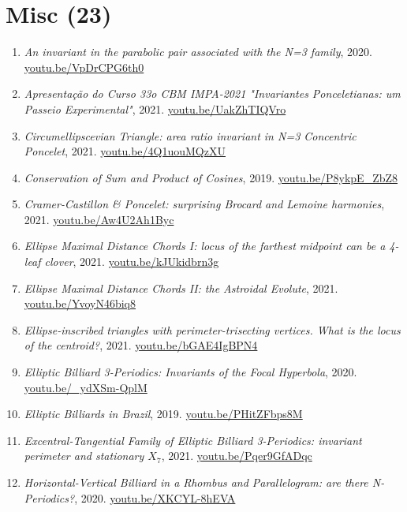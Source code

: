 \documentclass[12pt]{article}
\begin{document}
\section{Misc (23)}

\begin{enumerate}[resume]
\item \textit{An invariant in the parabolic pair associated with the N=3 family}, 2020. \href{https://youtu.be/VpDrCPG6th0}{\url{youtu.be/VpDrCPG6th0}}
\item \textit{Apresentação do Curso 33o CBM IMPA-2021
"Invariantes Ponceletianas: um Passeio Experimental"}, 2021. \href{https://youtu.be/UakZhTIQVro}{\url{youtu.be/UakZhTIQVro}}
\item \textit{Circumellipscevian Triangle: area ratio invariant in N=3 Concentric Poncelet}, 2021. \href{https://youtu.be/4Q1uouMQzXU}{\url{youtu.be/4Q1uouMQzXU}}
\item \textit{Conservation of Sum and Product of Cosines}, 2019. \href{https://youtu.be/P8ykpE_ZbZ8}{\url{youtu.be/P8ykpE\_ZbZ8}}
\item \textit{Cramer-Castillon \& Poncelet: surprising Brocard and Lemoine harmonies}, 2021. \href{https://youtu.be/Aw4U2Ah1Byc}{\url{youtu.be/Aw4U2Ah1Byc}}
\item \textit{Ellipse Maximal Distance Chords I: locus of the farthest midpoint can be a 4-leaf clover}, 2021. \href{https://youtu.be/kJUkidbrn3g}{\url{youtu.be/kJUkidbrn3g}}
\item \textit{Ellipse Maximal Distance Chords II: the Astroidal Evolute}, 2021. \href{https://youtu.be/YvoyN46biq8}{\url{youtu.be/YvoyN46biq8}}
\item \textit{Ellipse-inscribed triangles with perimeter-trisecting vertices. What is the locus of the centroid?}, 2021. \href{https://youtu.be/bGAE4IgBPN4}{\url{youtu.be/bGAE4IgBPN4}}
\item \textit{Elliptic Billiard 3-Periodics: Invariants of the Focal Hyperbola}, 2020. \href{https://youtu.be/_ydXSm-QplM}{\url{youtu.be/\_ydXSm-QplM}}
\item \textit{Elliptic Billiards in Brazil}, 2019. \href{https://youtu.be/PHitZFbps8M}{\url{youtu.be/PHitZFbps8M}}
\item \textit{Excentral-Tangential Family of Elliptic Billiard 3-Periodics: invariant perimeter and stationary $X_{7}$}, 2021. \href{https://youtu.be/Pqer9GfADqc}{\url{youtu.be/Pqer9GfADqc}}
\item \textit{Horizontal-Vertical Billiard in a Rhombus and Parallelogram: are there N-Periodics?}, 2020. \href{https://youtu.be/XKCYL-8hEVA}{\url{youtu.be/XKCYL-8hEVA}}

\end{enumerate}
\end{document}
